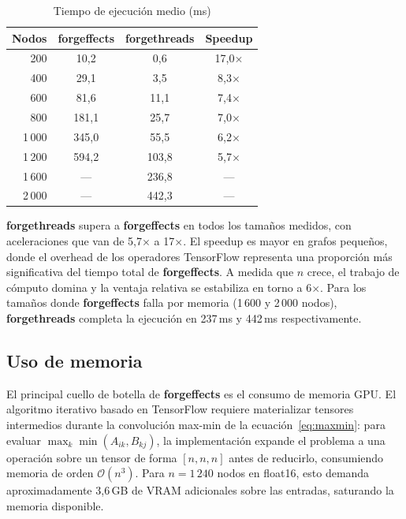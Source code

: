 \documentclass[conference]{IEEEtran}
\begin{document}
\begin{table}[htbp]
\caption{Tiempo de ejecución medio (ms)}
\begin{center}
\begin{tabular}{|r|c|c|c|}
\hline
\textbf{Nodos} & \textbf{forgeffects} & \textbf{forgethreads} & \textbf{Speedup} \\
\hline
200    & 10{,}2  & 0{,}6   & 17{,}0$\times$ \\
400    & 29{,}1  & 3{,}5   & 8{,}3$\times$  \\
600    & 81{,}6  & 11{,}1  & 7{,}4$\times$  \\
800    & 181{,}1 & 25{,}7  & 7{,}0$\times$  \\
1\,000 & 345{,}0 & 55{,}5  & 6{,}2$\times$  \\
1\,200 & 594{,}2 & 103{,}8 & 5{,}7$\times$  \\
1\,600 & ---     & 236{,}8 & ---            \\
2\,000 & ---     & 442{,}3 & ---            \\
\hline
\end{tabular}
\label{tab:speed}
\end{center}
\end{table}

\textbf{forgethreads} supera a \textbf{forgeffects} en todos los tamaños medidos, con aceleraciones que van de 5{,}7$\times$ a 17$\times$. El speedup es mayor en grafos pequeños, donde el overhead de los operadores TensorFlow representa una proporción más significativa del tiempo total de \textbf{forgeffects}. A medida que $n$ crece, el trabajo de cómputo domina y la ventaja relativa se estabiliza en torno a 6$\times$. Para los tamaños donde \textbf{forgeffects} falla por memoria (1\,600 y 2\,000 nodos), \textbf{forgethreads} completa la ejecución en 237\,ms y 442\,ms respectivamente.

\subsection{Uso de memoria}

El principal cuello de botella de \textbf{forgeffects} es el consumo de memoria GPU. El algoritmo iterativo basado en TensorFlow requiere materializar tensores intermedios durante la convolución max-min de la ecuación~\eqref{eq:maxmin}: para evaluar $\max_k\min(A_{ik}, B_{kj})$, la implementación expande el problema a una operación sobre un tensor de forma $[n, n, n]$ antes de reducirlo, consumiendo memoria de orden $\mathcal{O}(n^3)$. Para $n = 1\,240$ nodos en float16, esto demanda aproximadamente 3{,}6\,GB de VRAM adicionales sobre las entradas, saturando la memoria disponible.
\end{document}
